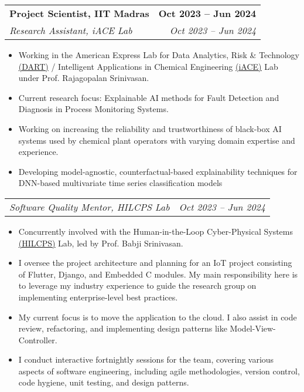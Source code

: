 \documentclass[letterpaper,11pt]{article}
\makeatletter
\newcommand{\resumeItem}[1]{
  \item\small{
    {#1 \vspace{-2pt}}
  }
}
\newcommand{\resumeSubheading}[4]{
  \vspace{-2pt}\item
    \begin{tabular*}{1.0\textwidth}[t]{l@{\extracolsep{\fill}}r}
      \textbf{#1} & \textbf{\small #2} \\
      \textit{\small#3} & \textit{\small #4} \\
    \end{tabular*}\vspace{-7pt}
}
\newcommand{\resumeSubSubheading}[2]{
    \item
    \begin{tabular*}{1.0\textwidth}{l@{\extracolsep{\fill}}r}
      \textit{\small#1} & \textit{\small #2} \\
    \end{tabular*}\vspace{-7pt}
}
\newcommand{\resumeItemListStart}{\begin{itemize}}
\newcommand{\resumeItemListEnd}{\end{itemize}\vspace{-5pt}}
\makeatother
\begin{document}
    \resumeSubheading
      {Project Scientist, IIT Madras}{Oct 2023 -- Jun 2024}
      {Research Assistant, iACE Lab}{Oct 2023 -- Jun 2024}
      \resumeItemListStart
        \resumeItem{Working in the American Express Lab for Data Analytics, Risk \& Technology
        \href{https://dart.iitm.ac.in/}{\underline{(DART)}}
        / Intelligent Applications in Chemical Engineering
        \href{https://home.iitm.ac.in/raj/}{\underline{(iACE)}}
        Lab under Prof. Rajagopalan Srinivasan.
        }
        \resumeItem{Current research focus: Explainable AI methods for Fault Detection and Diagnosis in Process Monitoring Systems. 
        }
        \resumeItem{ Working on increasing the reliability and trustworthiness of black-box AI systems used by chemical plant operators with varying domain expertise and experience.
        }
        \resumeItem{ Developing model-agnostic, counterfactual-based explainability techniques for DNN-based multivariate time series classification models
        }
      \resumeItemListEnd
    \vspace*{-5pt}
    \resumeSubSubheading
      {Software Quality Mentor, HILCPS Lab}{Oct 2023 -- Jun 2024}
      \resumeItemListStart
        \resumeItem{Concurrently involved with the Human-in-the-Loop Cyber-Physical Systems 
        \href{https://home.iitm.ac.in/babji.srinivasan/index.html}{\underline{(HILCPS)}}
         Lab, led by Prof. Babji Srinivasan.
        }
        \resumeItem{I oversee the project architecture and planning for an IoT project consisting of Flutter, Django, and Embedded C modules. My main responsibility here is to leverage my industry experience to guide the research group on implementing enterprise-level best practices.
        }
        \resumeItem{My current focus is to move the application to the cloud. I also assist in code review, refactoring, and implementing design patterns like Model-View-Controller.
        }
        \resumeItem{I conduct interactive fortnightly sessions for the team, covering various aspects of software engineering, including agile methodologies, version control, code hygiene, unit testing, and design patterns.
        }
    \resumeItemListEnd
\end{document}
